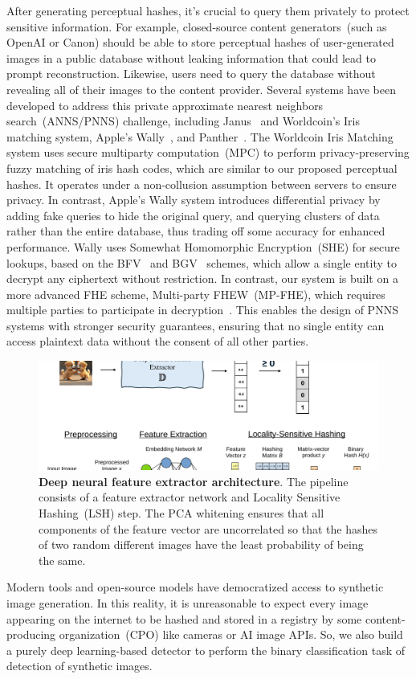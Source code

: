 After generating perceptual hashes, it's crucial to query them privately to protect sensitive information. For example, closed-source content generators~(such as OpenAI or Canon) should be able to store perceptual hashes of user-generated images in a public database without leaking information that could lead to prompt reconstruction. Likewise, users need to query the database without revealing all of their images to the content provider. Several systems have been developed to address this private approximate nearest neighbors search~(ANNS/PNNS) challenge, including Janus~\cite{edalatnejad2024janus} and Worldcoin's Iris~\cite{iris-search} matching system, Apple's Wally~\cite{wally-search}, and Panther~\cite{li2024panther}.
The Worldcoin Iris Matching system uses secure multiparty computation~(MPC) to perform privacy-preserving fuzzy matching of iris hash codes, which are similar to our proposed perceptual hashes. It operates under a non-collusion assumption between servers to ensure privacy. In contrast, Apple's Wally system introduces differential privacy by adding fake queries to hide the original query, and querying clusters of data rather than the entire database, thus trading off some accuracy for enhanced performance. Wally uses Somewhat Homomorphic Encryption~(SHE) for secure lookups, based on the BFV~\cite{fan2012somewhat, brakerski2012fully} and BGV~\cite{brakerski2014leveled} schemes, which allow a single entity to decrypt any ciphertext without restriction. In contrast, our system is built on a more advanced FHE scheme, Multi-party FHEW~(MP-FHE), which requires multiple parties to participate in decryption~\cite{mouchet2021multiparty, lee2023efficient}. This enables the design of PNNS systems with stronger security guarantees, ensuring that no single entity can access plaintext data without the consent of all other parties.
\begin{figure}[!t]
    \centering
    \clearpage
    \includegraphics[page=2, width=0.9\linewidth]{proteus.pdf}
    \caption{\textbf{Deep neural feature extractor architecture}. The pipeline consists of a feature extractor network and Locality Sensitive Hashing~(LSH) step. The PCA whitening ensures that all components of the feature vector are uncorrelated so that the hashes of two random different images have the least probability of being the same.}
    \label{fig:perceptual_hash}
\end{figure}
Modern tools and open-source models have democratized access to synthetic image generation. In this reality, it is unreasonable to expect every image appearing on the internet to be hashed and stored in a registry by some content-producing organization~(CPO) like cameras or AI image APIs. So, we also build a purely deep learning-based detector to perform the binary classification task of detection of synthetic images.


